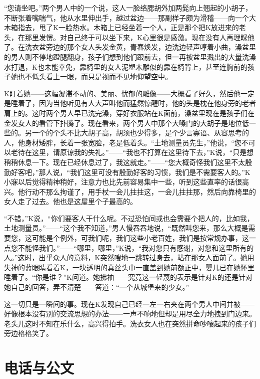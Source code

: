 \documentclass[12pt,a4paper]{article}
\begin{document}
“您请坐吧。”两个男人中的一个说，这人一脸络腮胡外加两髭向上翘起的小胡子，不断张着嘴喘气，他从水里伸出手，越过盆边——那副样子颇为滑稽——向一个大木箱指去，甩了K一脸热水。木箱上已经坐着一个人，正是那个把K放进来的老头，在那里发愣。对自己终于可以坐下来，K心里很是感激。现在没有人再理睬他了。在洗衣盆旁边的那个女人头发金黄，青春焕发，边洗边轻声哼着小曲，澡盆里的男人则不停地蹬腿翻身，孩子们想到他们跟前去，但一再被盆里溅出的大量洗澡水打退，K也未能幸免，靠椅里的女人泥塑木雕似的靠在椅背上，甚至连胸前的孩子她也不低头看上一眼，而只是视而不见地仰望空中。

K盯着她——这幅凝滞不动的、美丽、忧郁的雕像——大概看了好久，然后他一定是睡着了，因为当他听见有人大声叫他而猛然惊醒时，他的头是枕在他身旁的老者肩上的。这时两个男人早已洗完澡，穿好衣服站在K面前，澡盆里现在是孩子们在金发女人的看管下扑腾了。现在看来，两个男人中那个大嗓门的大胡子是地位低一些的。另一个的个头不比大胡子高，胡须也少得多，是个少言寡语、从容思考的人，他身材矮胖，长着一张宽脸，老是低着头。“土地测量员先生，”他说，“您不可以老待在这里，请原谅我的失礼。”——“我也不打算在这里待下去，”K说，“只是想稍稍休息一下。现在已经休息过了，我这就走。”——“您大概奇怪我们这里不太殷勤好客吧，”那人说，“我们这里可没有殷勤好客的习惯，我们是不需要客人的。”K小寐以后觉得精神稍好，注意力也比先前容易集中一些，听到这些直率的话很高兴。他行动不那么拘谨了，用手杖一会儿拄拄这，一会儿拄拄那，然后向靠椅里的女人走了过去。他也是这屋里个子最高的。

“不错，”K说，“你们要客人干什么呢。不过恐怕间或也会需要个把人的，比如我，土地测量员。”——“这个我不知道，”男人慢吞吞地说，“既然叫您来，那么大概是需要您，这可能是个例外，可我们呢，我们这些小老百姓，我们是按常规办事，这一点您不能怪我们。”——“哪里，哪里，”K说，“我对您只有感谢，对您和这里所有的人。”这时，出乎众人的意料，K突然嗖地一跳转过身去，站在那女人面前了。她用失神的蓝眼睛看着K，一块透明的真丝头巾一直盖到她前额正中，婴儿已在她怀里睡着了。“你是谁？”K问道。她拂袖——究竟这一轻蔑的表示是针对K的还是针对她自己的回答，弄不清楚——答道：“一个从城堡来的少女。”

这一切只是一瞬间的事。现在K发现自己已经一左一右夹在两个男人中间并被——好像根本没有别的交流思想的办法——一声不响地但却是用尽全力地拽到门边来。老头儿这时不知在乐什么，高兴得拍手。洗衣女人也在突然拼命吵嚷起来的孩子们旁边格格笑了。
\par{}
\newpage
\section{电话与公文}
\vspace{0.5em}
\vspace{0.3em}
\end{document}
